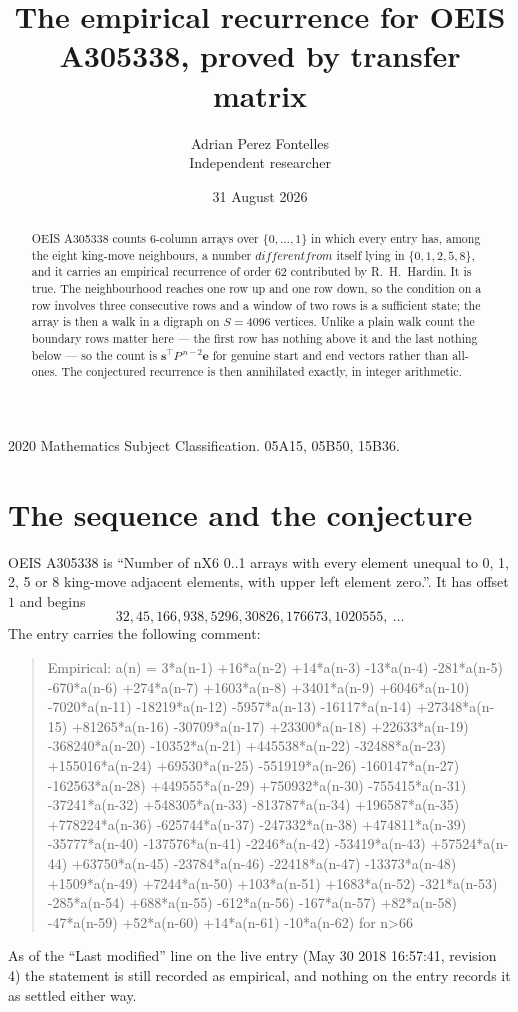 \documentclass[11pt,a4paper]{article}
\title{The empirical recurrence for OEIS A305338, proved by transfer matrix}
\author{Adrian Perez Fontelles\\ \small Independent researcher}
\date{31 August 2026}
\theoremstyle{plain}
\theoremstyle{definition}
\begin{document}
\maketitle

\begin{abstract}
OEIS A305338 counts $6$-column arrays over $\{0,\dots,1\}$ in which every entry has,
among the eight king-move neighbours, a number $different from$ itself lying in $\{0,1,2,5,8\}$, and it carries an empirical
recurrence of order $62$ contributed by R.~H.~Hardin. It is true. The neighbourhood
reaches one row up and one row down, so the condition on a row involves three consecutive
rows and a window of two rows is a sufficient state; the array is then a walk in a digraph
on $S=4096$ vertices. Unlike a plain walk count the boundary rows matter here --- the first
row has nothing above it and the last nothing below --- so the count is
$\mathbf{s}^{\!\top}P^{\,n-2}\mathbf{e}$ for genuine start and end vectors rather than
all-ones. The conjectured recurrence is then annihilated exactly, in integer arithmetic.
\end{abstract}

\noindent\small 2020 Mathematics Subject Classification. 05A15, 05B50, 15B36.\normalsize

\section{The sequence and the conjecture}

OEIS A305338 is ``Number of nX6 0..1 arrays with every element unequal to 0, 1, 2, 5 or 8 king-move adjacent elements, with upper left element zero.''. It has offset
$1$ and begins
\[
32, 45, 166, 938, 5296, 30826, 176673, 1020555,\ \dots
\]
The entry carries the following comment:
\begin{quote}\small
Empirical: a(n) = 3*a(n-1) +16*a(n-2) +14*a(n-3) -13*a(n-4) -281*a(n-5) -670*a(n-6) +274*a(n-7) +1603*a(n-8) +3401*a(n-9) +6046*a(n-10) -7020*a(n-11) -18219*a(n-12) -5957*a(n-13) -16117*a(n-14) +27348*a(n-15) +81265*a(n-16) -30709*a(n-17) +23300*a(n-18) +22633*a(n-19) -368240*a(n-20) -10352*a(n-21) +445538*a(n-22) -32488*a(n-23) +155016*a(n-24) +69530*a(n-25) -551919*a(n-26) -160147*a(n-27) -162563*a(n-28) +449555*a(n-29) +750932*a(n-30) -755415*a(n-31) -37241*a(n-32) +548305*a(n-33) -813787*a(n-34) +196587*a(n-35) +778224*a(n-36) -625744*a(n-37) -247332*a(n-38) +474811*a(n-39) -35777*a(n-40) -137576*a(n-41) -2246*a(n-42) -53419*a(n-43) +57524*a(n-44) +63750*a(n-45) -23784*a(n-46) -22418*a(n-47) -13373*a(n-48) +1509*a(n-49) +7244*a(n-50) +103*a(n-51) +1683*a(n-52) -321*a(n-53) -285*a(n-54) +688*a(n-55) -612*a(n-56) -167*a(n-57) +82*a(n-58) -47*a(n-59) +52*a(n-60) +14*a(n-61) -10*a(n-62) for n>66
\end{quote}
As of the ``Last modified'' line on the live entry (May 30 2018 16:57:41, revision
4) the statement is still recorded as empirical, and nothing on the entry
records it as settled either way.
\end{document}
